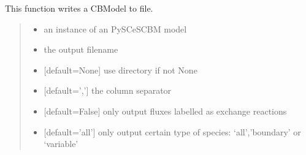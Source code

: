 \documentclass[letterpaper,12pt,english]{sphinxmanual}
\begin{document}
\begin{fulllineitems}

\pysigstartsignatures
\pysiglinewithargsret
{}
{\sphinxparamcomma {}\sphinxparamcomma {}\sphinxparamcomma {}\sphinxparamcomma {}\sphinxparamcomma {}}
{}
\pysigstopsignatures
\sphinxAtStartPar
This function writes a CBModel to file.
\begin{quote}\begin{description}
\begin{itemize}
\item {} 
\sphinxAtStartPar
{} \textendash{} an instance of an PySCeSCBM model

\item {} 
\sphinxAtStartPar
{} \textendash{} the output filename

\item {} 
\sphinxAtStartPar
{} \textendash{} {[}default=None{]} use directory if not None

\item {} 
\sphinxAtStartPar
{} \textendash{} {[}default=’,’{]} the column separator

\item {} 
\sphinxAtStartPar
{} \textendash{} {[}default=False{]} only output fluxes labelled as exchange reactions

\item {} 
\sphinxAtStartPar
{} \textendash{} {[}default=’all’{]} only output certain type of species: ‘all’,’boundary’ or ‘variable’

\end{itemize}

\end{description}\end{quote}

\end{fulllineitems}
\end{document}

